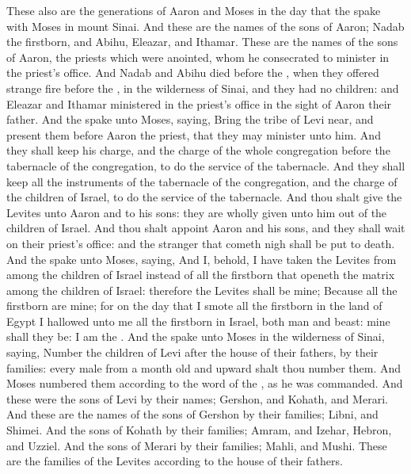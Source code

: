 \begin{biblechapter} %
 These also are the generations of Aaron and Moses in the day that the \LORD spake with Moses in mount Sinai.
\verse And these are the names of the sons of Aaron; Nadab the firstborn, and Abihu, Eleazar, and Ithamar.
\verse These are the names of the sons of Aaron, the priests which were anointed, whom he consecrated to minister in the priest's office.
\verse And Nadab and Abihu died before the \LORD, when they offered strange fire before the \LORD, in the wilderness of Sinai, and they had no children: and Eleazar and Ithamar ministered in the priest's office in the sight of Aaron their father.
\verse And the \LORD spake unto Moses, saying,
\verse Bring the tribe of Levi near, and present them before Aaron the priest, that they may minister unto him.
\verse And they shall keep his charge, and the charge of the whole congregation before the tabernacle of the congregation, to do the service of the tabernacle.
\verse And they shall keep all the instruments of the tabernacle of the congregation, and the charge of the children of Israel, to do the service of the tabernacle.
\verse And thou shalt give the Levites unto Aaron and to his sons: they are wholly given unto him out of the children of Israel.
\verse And thou shalt appoint Aaron and his sons, and they shall wait on their priest's office: and the stranger that cometh nigh shall be put to death.
\verse And the \LORD spake unto Moses, saying,
\verse And I, behold, I have taken the Levites from among the children of Israel instead of all the firstborn that openeth the matrix among the children of Israel: therefore the Levites shall be mine;
\verse Because all the firstborn are mine; for on the day that I smote all the firstborn in the land of Egypt I hallowed unto me all the firstborn in Israel, both man and beast: mine shall they be: I am the \LORD.
\verse And the \LORD spake unto Moses in the wilderness of Sinai, saying,
\verse Number the children of Levi after the house of their fathers, by their families: every male from a month old and upward shalt thou number them.
\verse And Moses numbered them according to the word of the \LORD, as he was commanded.
\verse And these were the sons of Levi by their names; Gershon, and Kohath, and Merari.
\verse And these are the names of the sons of Gershon by their families; Libni, and Shimei.
\verse And the sons of Kohath by their families; Amram, and Izehar, Hebron, and Uzziel.
\verse And the sons of Merari by their families; Mahli, and Mushi. These are the families of the Levites according to the house of their fathers.

\end{biblechapter}
